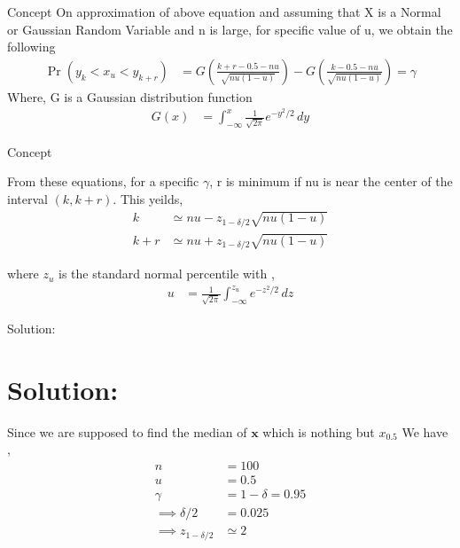 \documentclass{beamer}
\providecommand{\pr}[1]{\ensuremath{\Pr\left(#1\right)}}
\theoremstyle{remark}
\numberwithin{equation}{subsection}
\let\vec\mathbf
\begin{document}
\begin{frame}{Concept}
    On approximation of above equation and assuming that X is a Normal or Gaussian Random Variable and n is large, for specific value of u,
    we obtain the following
    \begin{align}
        \pr{y_k < x_u < y_{k+r}} &= G(\frac{k + r - 0.5 - nu}{\sqrt{nu(1-u)}}) - G(\frac{k - 0.5 - nu}{\sqrt{nu(1-u)}}) = \gamma
     \end{align}
     Where, G is a Gaussian distribution function
     \begin{align}
         G(x) &= \int_{-\infty}^{x} \frac{1}{\sqrt{2\pi}} e^{-y^2/2} \, dy
     \end{align}
\end{frame}

\begin{frame}{Concept}

    From these equations, for a specific $\gamma$, r is minimum if nu is near the center of the interval $(k, k+r)$. This yeilds,
    \begin{align}
        k &\simeq nu-z_{1-\delta/2}\sqrt{nu(1-u)} \\
        k+r &\simeq nu+z_{1-\delta/2}\sqrt{nu(1-u)} 
    \end{align}
    
    where $z_u$ is the standard normal percentile with ,
\begin{align}
    u &= \frac{1}{\sqrt{2\pi}} \int_{-\infty}^{z_u} e^{-z^2/2} \, dz
\end{align}
\end{frame}

\begin{frame}{Solution:}

    \section{Solution:}
    Since we are supposed to find the median of $\vec{x}$ which is nothing but $x_{0.5}$ We have ,
    \begin{align}
        n &= 100 \\
        u &= 0.5 \\
        \gamma &= 1-\delta = 0.95 \\
        \implies \delta/2 &= 0.025\\
        \implies z_{1-\delta/2} &\simeq 2
    \end{align}
\end{frame}
\end{document}
